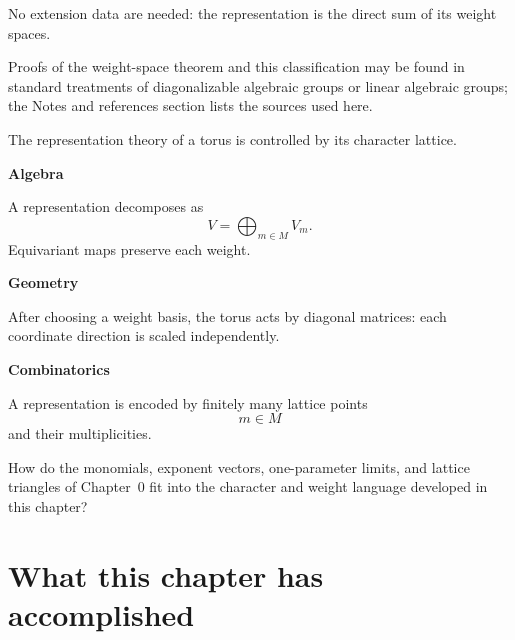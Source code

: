 No extension data are needed: the representation is the direct sum of
its weight spaces.

\begin{observation}
Proofs of the weight-space theorem and this classification may be
found in standard treatments of diagonalizable algebraic groups or
linear algebraic groups; the Notes and references section lists the
sources used here.
\end{observation}

\begin{threedictionaries}
The representation theory of a torus is controlled by its character
lattice.

\medskip

\noindent
\begin{minipage}[t]{0.30\linewidth}
\centering
\textbf{Algebra}\par
\smallskip
A representation decomposes as
\[
V=\bigoplus_{m\in M}V_m.
\]
Equivariant maps preserve each weight.
\end{minipage}
\hfill
\begin{minipage}[t]{0.30\linewidth}
\centering
\textbf{Geometry}\par
\smallskip
After choosing a weight basis, the torus acts by diagonal matrices:
each coordinate direction is scaled independently.
\end{minipage}
\hfill
\begin{minipage}[t]{0.30\linewidth}
\centering
\textbf{Combinatorics}\par
\smallskip
A representation is encoded by finitely many lattice points
\[
m\in M
\]
and their multiplicities.
\end{minipage}
\end{threedictionaries}

\begin{guidingquestion}
How do the monomials, exponent vectors, one-parameter limits, and
lattice triangles of Chapter~0 fit into the character and weight
language developed in this chapter?
\end{guidingquestion}


\section*{What this chapter has accomplished}
\label{sec:why-torus-representation-matters}

